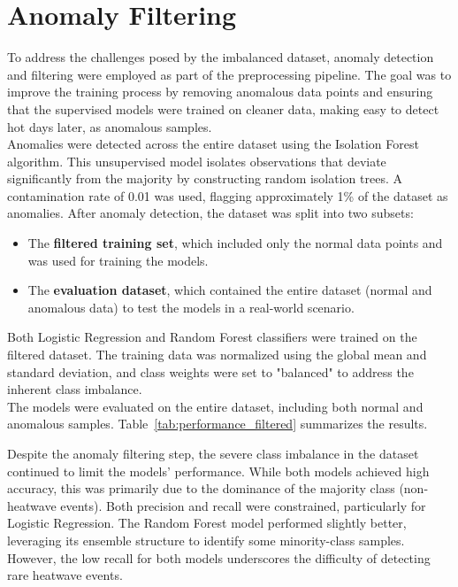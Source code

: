 \documentclass[conference,9pt]{IEEEtran}
\begin{document}
\section{Anomaly Filtering}
To address the challenges posed by the imbalanced dataset, anomaly detection and filtering were employed as part of the preprocessing pipeline. The goal was to improve the training process by removing anomalous data points and ensuring that the supervised models were trained on cleaner data, making easy to detect hot days later, as anomalous samples.\\
Anomalies were detected across the entire dataset using the Isolation Forest algorithm. This unsupervised model isolates observations that deviate significantly from the majority by constructing random isolation trees. A contamination rate of 0.01 was used, flagging approximately 1\% of the dataset as anomalies. After anomaly detection, the dataset was split into two subsets:
\begin{itemize}
    \item The \textbf{filtered training set}, which included only the normal data points and was used for training the models.
    \item The \textbf{evaluation dataset}, which contained the entire dataset (normal and anomalous data) to test the models in a real-world scenario.
\end{itemize}
Both Logistic Regression and Random Forest classifiers were trained on the filtered dataset. The training data was normalized using the global mean and standard deviation, and class weights were set to "balanced" to address the inherent class imbalance.\\
The models were evaluated on the entire dataset, including both normal and anomalous samples. Table~\ref{tab:performance_filtered} summarizes the results.
\begin{table}[h!]
\centering
\caption{Performance Metrics after Anomaly Filtering}
\label{tab:performance_filtered}
\end{table}
Despite the anomaly filtering step, the severe class imbalance in the dataset continued to limit the models' performance. While both models achieved high accuracy, this was primarily due to the dominance of the majority class (non-heatwave events). Both precision and recall were constrained, particularly for Logistic Regression. The Random Forest model performed slightly better, leveraging its ensemble structure to identify some minority-class samples. However, the low recall for both models underscores the difficulty of detecting rare heatwave events.
\end{document}
